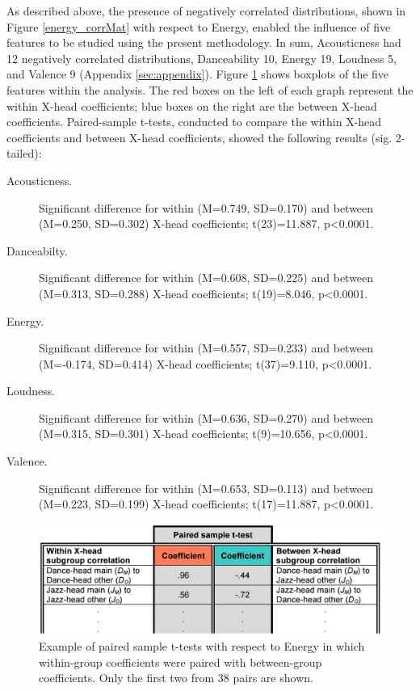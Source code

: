 \documentclass[a4paper]{article}
\begin{document}
As described above, the presence of negatively correlated distributions, shown in Figure \ref{energy_corrMat} with respect to Energy, enabled the influence of five features to be studied using the present methodology. In sum, Acousticness had 12 negatively correlated distributions, Danceability 10, Energy 19, Loudness 5, and Valence 9 (Appendix \ref{sec:appendix}). Figure \ref{tTest_Outline} shows boxplots of the five features within the analysis. The red boxes on the left of each graph represent the within X-head coefficients; blue boxes on the right are the between X-head coefficients. Paired-sample t-tests, conducted to compare the within X-head coefficients and between X-head coefficients, showed the following results (sig. 2-tailed): 

\begin{description}
\item[Acousticness.] Significant difference for within (M=0.749, SD=0.170) and between (M=0.250, SD=0.302) X-head coefficients; t(23)=11.887, p<0.0001.
\item[Danceabilty.] Significant difference for within (M=0.608, SD=0.225) and between (M=0.313, SD=0.288) X-head coefficients; t(19)=8.046, p<0.0001.
\item[Energy.] Significant difference for within (M=0.557, SD=0.233) and between (M=-0.174, SD=0.414) X-head coefficients; t(37)=9.110, p<0.0001.
\item[Loudness.] Significant difference for within (M=0.636, SD=0.270) and between (M=0.315, SD=0.301) X-head coefficients; t(9)=10.656, p<0.0001.
\item[Valence.] Significant difference for within (M=0.653, SD=0.113) and between (M=0.223, SD=0.199) X-head coefficients; t(17)=11.887, p<0.0001.
\end{description}

\begin{figure}[h!]
\centering
\includegraphics[width=\linewidth]{tTest_Outline.png}
\caption[Feature-Pair T-Test Analysis]{Example of paired sample t-tests with respect to Energy in which within-group coefficients were paired with between-group coefficients. Only the first two from 38 pairs are shown.}
\label{tTest_Outline}
\end{figure}
\end{document}
